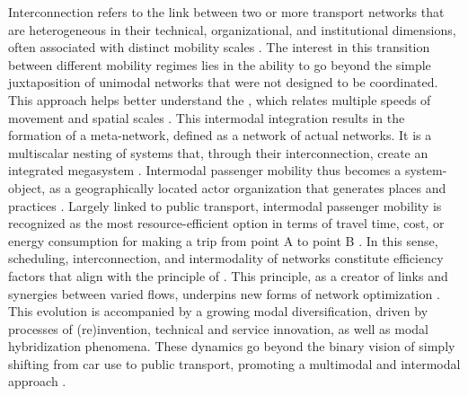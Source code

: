 \begin{refsegment}
Interconnection refers to the link between two or more transport networks that are heterogeneous in their technical, organizational, and institutional dimensions, often associated with distinct mobility scales \textcolor{blue}{\autocites[]{dupuy_reseaux_1988}{varlet_interconnexion_1992}}. The interest in this transition between different mobility regimes lies in the ability to go beyond the simple juxtaposition of unimodal networks that were not designed to be coordinated. This approach helps better understand the , which relates multiple speeds of movement and spatial scales \textcolor{blue}{\autocite[156]{peters_time_1960}}. This intermodal integration results in the formation of a meta-network, defined as a network of actual networks. It is a multiscalar nesting of systems that, through their interconnection, create an integrated megasystem \textcolor{blue}{\autocite[89]{ageron_intermodalite-voyageurs_2013}}. Intermodal passenger mobility thus becomes a system-object, as a geographically located actor organization that generates places and practices \textcolor{blue}{\autocite[15]{varlet_interconnexion_1992}}. Largely linked to public transport, intermodal passenger mobility is recognized as the most resource-efficient option in terms of travel time, cost, or energy consumption for making a trip from point A to point B \textcolor{blue}{\autocite[73]{oostendorp_combining_2018}}. In this sense, scheduling, interconnection, and intermodality of networks constitute efficiency factors that align with the principle of . This principle, as a creator of links and synergies between varied flows, underpins new forms of network optimization \textcolor{blue}{\autocite[16-17]{amar_homo_2016}}. This evolution is accompanied by a growing modal diversification, driven by processes of (re)invention, technical and service innovation, as well as modal hybridization phenomena. These dynamics go beyond the binary vision of simply shifting from car use to public transport, promoting a multimodal and intermodal approach \textcolor{blue}{\autocite{richer_dossier_2021}}.%


\end{refsegment}
